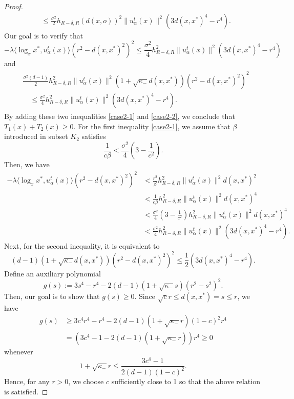 \documentclass[10pt,a4paper]{amsart}
\newcommand{\dist}{d}%
\newcommand{\p}{o}%
\begin{document}
\begin{proof}
\begin{align*}
&\leq  \frac{\sigma^2    }{2}  h_{R-\delta,R}\left(\dist(x, \p)\right)^2\|u_\alpha^t(x)\|^2   (3d(x,x^*)^4-r^4  ).
\end{align*}
Our goal is to verify  that
\begin{equation} \label{case2-1}
 -\lambda \langle \log_xx^*,u_\alpha^t(x)\rangle(r^2 - d(x,x^*)^2)^2  \leq \frac{\sigma^2   }{4} h_{R-\delta,R}^2 \|u_\alpha^t(x)\|^2   (3d(x,x^*)^4-r^4  )
\end{equation}
and
\begin{align} \label{case2-2}
\begin{aligned}
  &\frac{\sigma^2   (d-1)}{2}h_{R-\delta,R}^2\|u_\alpha^t(x)\|^2 (1+\sqrt{\kappa_-} d(x,x^*) )(r^2 - d(x,x^*)^2)^2 \\
  &\quad \leq \frac{\sigma^2   }{4}h_{R-\delta,R}^2 \|u_\alpha^t(x)\|^2   (3d(x,x^*)^4-r^4  ).
\end{aligned}
\end{align}
 By adding these two inequalities \eqref{case2-1} and \eqref{case2-2}, we conclude that $T_1(x)+T_2(x)\geq0$. For the first inequality \eqref{case2-1}, we assume that $\beta$ introduced in subset $K_2$ satisfies
\begin{equation} \label{const-beta}
\frac{1}{c\beta} <\frac{\sigma^2  }{4}\left(3-\frac{1}{c^2}\right).
\end{equation}
Then, we have
\begin{align*}
 -\lambda \langle \log_xx^*,u_\alpha^t(x)\rangle(r^2 - d(x,x^*)^2)^2 &<  \frac{r^2}{\beta}h_{R-\delta,R}^2 \|u_\alpha^t(x)\|^2 d(x,x^*)^2 \\
 &< \frac{1}{c\beta}h_{R-\delta,R}^2 \|u_\alpha^t(x)\|^2 d(x,x^*)^4 \\
 &<\frac{\sigma^2  }{4}\left(3-\frac{1}{c^2}\right)h_{R-\delta,R}^2 \|u_\alpha^t(x)\|^2 d(x,x^*)^4  \\
 & < \frac{\sigma^2  }{4} h_{R-\delta,R}^2 \|u_\alpha^t(x)\|^2 (3d(x,x^*)^4 - r^4).
\end{align*}
Next, for the second inequality, it is equivalent to 
\[
(d-1)( 1+ \sqrt{\kappa_-}d(x,x^*)) (r^2 - d(x,x^*)^2)^2 \leq \frac{1}{2}  (3d(x,x^*)^4-r^4  ).
\]
Define an auxiliary polynomial
\[
g(s) := 3s^4 - r^4 - 2(d-1)(1+\sqrt{\kappa_-}s)(r^2- s^2)^2.
\]
Then, our goal is to show that $g(s)\geq0$. Since $\sqrt cr\leq d(x,x^*)=s\leq r$, we have
\begin{align*}
g(s) &\geq 3c^4 r^4-r^4 - 2(d-1)(1+\sqrt{\kappa_-}r)(1-c)^2 r^4 \\
&= ( 3c^4 -1 - 2(d-1)(1+\sqrt{\kappa_-}r))r^4 \geq0
\end{align*}
whenever
\[
1+\sqrt{\kappa_-} r \leq \frac{3c^4-1}{2(d-1)(1-c)^2}.
\]
Hence, for any $r>0$, we choose $c$ sufficiently close to 1 so that the above relation is satisfied. \newline



\end{proof}
\end{document}
